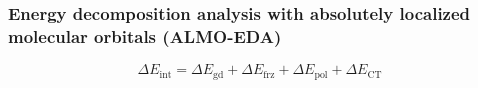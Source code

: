 \documentclass{beamer}
\begin{document}
\begin{frame}
  \frametitle{Energy decomposition analysis with absolutely localized molecular orbitals (ALMO-EDA)}
  \centering
  \begin{equation*}
    \Delta E_{\text{int}} = \Delta E_{\text{gd}} + \Delta E_{\text{frz}} + \Delta E_{\text{pol}} + \Delta E_{\text{CT}}
  \end{equation*}

\end{frame}
\end{document}
